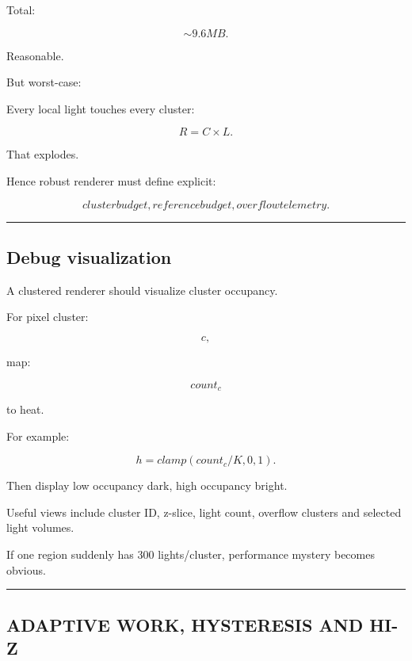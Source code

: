 Total:

\[
\sim9.6MB.
\]

Reasonable.

But worst-case:

Every local light touches every cluster:

\[
R=C\times L.
\]

That explodes.

Hence robust renderer must define explicit:

\[
\boxed{
cluster budget,
reference budget,
overflow telemetry.
}
\]

\begin{center}\rule{0.5\linewidth}{0.5pt}\end{center}

\subsection{Debug visualization}\label{04-visual-computing-ii-ch040-debug-visualization}

\hypertarget{04-visual-computing-ii-ch040-debug-visualization}{}

A clustered renderer should visualize cluster occupancy.

For pixel cluster:

\[
c,
\]

map:

\[
count_c
\]

to heat.

For example:

\[
h=
clamp(
count_c/K,
0,1
).
\]

Then display low occupancy dark, high occupancy bright.

Useful views include cluster ID, z-slice, light count, overflow clusters and selected light volumes.

If one region suddenly has 300 lights/cluster, performance mystery becomes obvious.

\begin{center}\rule{0.5\linewidth}{0.5pt}\end{center}

\subsection{ADAPTIVE WORK, HYSTERESIS AND HI-Z}\label{04-visual-computing-ii-ch040-adaptive-work-hysteresis-and-hi-z}

\hypertarget{04-visual-computing-ii-ch040-adaptive-work-hysteresis-and-hi-z}{}

